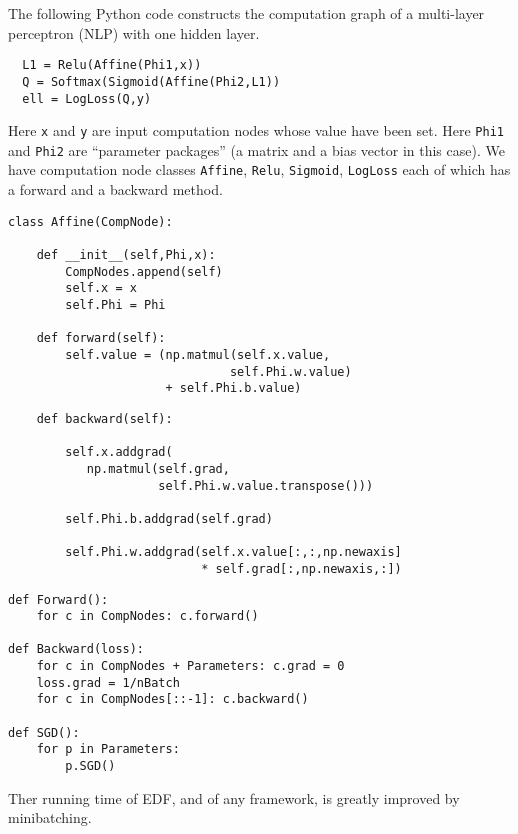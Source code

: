 {
\medskip

The following Python code constructs the computation graph of a multi-layer perceptron (NLP) with one hidden layer.

\vfill
\begin{verbatim}
  L1 = Relu(Affine(Phi1,x))
  Q = Softmax(Sigmoid(Affine(Phi2,L1))
  ell = LogLoss(Q,y)
\end{verbatim}

\vfill
Here {\tt x} and {\tt y} are input computation nodes
whose value have been set.
Here {\tt Phi1} and {\tt Phi2} are ``parameter packages'' (a matrix and a bias vector in this case).
We have computation node classes {\tt Affine}, {\tt Relu}, {\tt Sigmoid}, {\tt LogLoss} each of which has
a forward and a backward method.

\vfill
\eject
\begin{verbatim}
class Affine(CompNode):

    def __init__(self,Phi,x):
        CompNodes.append(self)
        self.x = x
        self.Phi = Phi

    def forward(self):
        self.value = (np.matmul(self.x.value,
                               self.Phi.w.value)
                      + self.Phi.b.value)
\end{verbatim}
\vfill
\eject
\vfill
\begin{verbatim}
    def backward(self):

        self.x.addgrad(
           np.matmul(self.grad,
                     self.Phi.w.value.transpose()))

        self.Phi.b.addgrad(self.grad)

        self.Phi.w.addgrad(self.x.value[:,:,np.newaxis]
                           * self.grad[:,np.newaxis,:])
\end{verbatim}


\begin{verbatim}
def Forward():
    for c in CompNodes: c.forward()

def Backward(loss):
    for c in CompNodes + Parameters: c.grad = 0
    loss.grad = 1/nBatch
    for c in CompNodes[::-1]: c.backward()

def SGD():
    for p in Parameters:
        p.SGD()
\end{verbatim}
\vfill


Ther running time of EDF, and of any framework, is greatly improved by minibatching.

}
